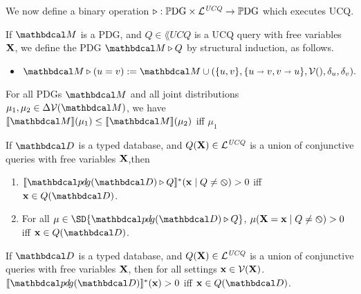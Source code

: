 \documentclass{article}
\begin{document}
We now define a binary operation $\triangleright : \mathbb{P}\mathrm{DG} \times \mathcal L^{\mathit{UCQ}} \to \mathbb{P}\mathrm{DG}$ which executes UCQ.
\begin{defn}[\texorpdfstring{$\qq$}{>}]
  If $\dg M$ is a PDG, and $Q \in \lang{UCQ}$ is a UCQ query with free variables $\mathbf X$, we define the PDG $\dg M \qq Q$ by structural induction, as follows.
  
  \begin{itemize}
  	\item $\dg M \qq  (u = v) :=  \dg M \cup (\{u,v\}, \{u\shortrightarrow v, v\shortrightarrow u\}, \V(), \delta_{u}, \delta_{v}).$
  \end{itemize}
\end{defn}

\begin{inactive}
\begin{prop}
  For all PDGs $\dg M$ and all joint distributions $\mu_1, \mu_2 \in \Delta\V(\dg M)$, we have
  $\bbr{\dg M}(\mu_{1}) \le \bbr{\dg M}(\mu_{2})$ iff $\mu_{1}$
\end{prop}
\end{inactive}

\begin{prop}
  If $\D$ is a typed database, and $Q(\mathbf X) \in \mathcal L^{\mathit{UCQ}}$ is a union of conjunctive queries with free variables $\mathbf X$,then
  \begin{enumerate}[label=(\alph*)]
	\item $\bbr{\PDGof{\D} \qq Q}^{*}(\mat x \mid Q \ne \none) > 0$ iff $\mat x \in Q(\D)$.
	\item For all $\mu \in \SD{\PDGof{\D} \qq Q}$, $\mu(\mathbf X = \mathbf x \mid Q \neq\varobslash) > 0$ iff $\mat x \in Q(\D)$.
  \end{enumerate}
\end{prop}

\begin{prop}
  If $\D$ is a typed database, and $Q(\mathbf X) \in \mathcal L^{\mathit{UCQ}}$ is a union of conjunctive queries with free variables $\mathbf X$, then
  for all settings $\mathbf x \in \mathcal V(\mathbf X)$.
  $\bbr{\PDGof{\D}}^{*}(\mat x) > 0$ iff $\mat x \in Q(\D)$.
\end{prop}
\end{document}
